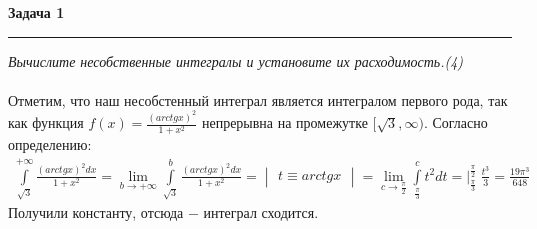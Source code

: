 \documentclass[a4paper,11pt]{article}
\begin{document}
\textbf{\large Задача 1}
\medskip\hrule\medskip
\textit{Вычислите несобственные интегралы и установите их расходимость.(4)} \\ \\
Отметим, что наш несобстенный интеграл является интегралом первого рода, так как функция $ f(x) = \frac{(arctg x)^2}{1 + x^2} $ непрерывна на промежутке $ [\sqrt{3}, \infty) $. Согласно определению:
\begin{gather*}
\int\limits_{\sqrt{3}}^{+\infty} \frac{(arctg x)^2 dx}{1 + x^2} = 
\lim\limits_{b \to +\infty}\int\limits_{\sqrt{3}}^{b} \frac{(arctg x)^2 dx}{1 + x^2} =
\begin{vmatrix} t \equiv arctg x\end{vmatrix} = 
\lim\limits_{c \to \frac{\pi}{2}}\int\limits_{\frac{\pi}{3}}^{c} t^2dt = 
\Big|_{\frac{\pi}{3}}^{\frac{\pi}{2}} \; \frac{t^3}{3} = \frac{19\pi^3}{648} 
\end{gather*}
Получили константу, отсюда $ - $ интеграл сходится.
\\ \\ \\ 
\end{document}
